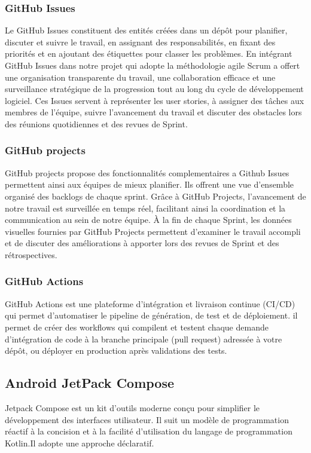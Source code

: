 \subsubsection{GitHub Issues}
Le GitHub Issues constituent des entités créées  dans un dépôt pour planifier, discuter et suivre le travail, en assignant des responsabilités, en fixant des priorités et en ajoutant des étiquettes pour classer les problèmes\cite{githubProposGitHub}.
En intégrant GitHub Issues dans notre projet qui adopte la méthodologie agile Scrum a offert une organisation transparente du travail, une collaboration efficace et une surveillance stratégique de la progression tout au long du cycle de développement logiciel. Ces Issues servent à représenter les user stories, à assigner des tâches aux membres de l'équipe, suivre l'avancement du travail et discuter des obstacles lors des réunions quotidiennes et des revues de Sprint.

\subsubsection{GitHub projects}
GitHub projects propose des fonctionnalités complementaires a Github Issues permettent ainsi aux équipes de mieux planifier. Ils offrent une vue d'ensemble organisé des backlogs de chaque sprint.
Grâce à GitHub Projects, l'avancement de notre travail est surveillée  en temps réel, facilitant ainsi la coordination et la communication au sein de notre équipe. À la fin de chaque Sprint, les données visuelles fournies par GitHub Projects permettent d'examiner le travail accompli et de discuter des améliorations à apporter lors des revues de Sprint et des rétrospectives.
\subsubsection{GitHub Actions}
GitHub Actions est une plateforme d'intégration et livraison continue (CI/CD) qui permet d'automatiser le pipeline de génération, de test et de déploiement\cite{ComprendreGitHub}. il permet de créer des workflows qui compilent et testent chaque demande d'intégration de code à la branche principale (pull request) adressée à votre dépôt, ou déployer en production après validations des tests.


\subsection{Android JetPack Compose}
Jetpack Compose est un kit d'outils moderne conçu pour simplifier le développement des interfaces utilisateur\cite{androidPrincipesBase}. Il  suit un modèle de programmation réactif à la concision et à la facilité d'utilisation du langage de programmation Kotlin.Il adopte une approche déclaratif.


